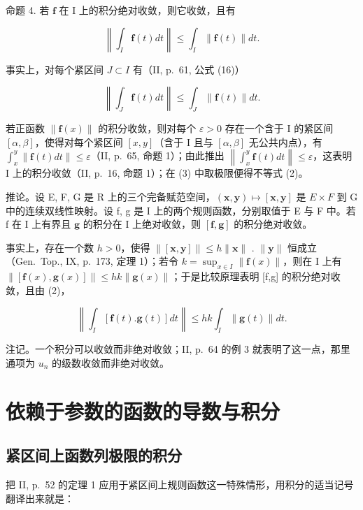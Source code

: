 命题 4. 若 \(\mathbf{f}\) 在 \(\mathrm{I}\) 上的积分绝对收敛，则它收敛，且有

\[
\left\| \int_ {I} \mathbf {f} (t) d t \right\| \leqslant \int_ {I} \| \mathbf {f} (t) \| d t.\tag{2}
\]

事实上，对每个紧区间 \(J \subset I\) 有（II, p.~61, 公式 (16)）

\[
\left\| \int_ {J} \mathbf {f} (t) d t \right\| \leqslant \int_ {J} \| \mathbf {f} (t) \| d t.\tag{3}
\]

若正函数 \(\|\mathbf{f}(x)\|\) 的积分收敛，则对每个 \(\varepsilon > 0\) 存在一个含于 I 的紧区间 \([\alpha, \beta]\)，使得对每个紧区间 \([x, y]\)（含于 I 且与 \([\alpha, \beta]\) 无公共内点），有 \(\int_{x}^{y} \|\mathbf{f}(t) dt\| \leqslant \varepsilon\)（II, p.~65, 命题 1）；由此推出 \(\left\|\int_{x}^{y} \mathbf{f}(t) dt\right\| \leqslant \varepsilon\)，这表明 I 上的积分收敛（II, p.~16, 命题 1）；在 (3) 中取极限便得不等式 (2)。

推论。设 E, F, G 是 R 上的三个完备赋范空间，\((\mathbf{x}, \mathbf{y}) \mapsto [\mathbf{x}, \mathbf{y}]\) 是 \(E \times F\) 到 G 中的连续双线性映射。设 f, g 是 I 上的两个规则函数，分别取值于 E 与 F 中。若 f 在 I 上有界且 \(\mathbf{g}\) 的积分在 I 上绝对收敛，则 \([\mathbf{f},\mathbf{g}]\) 的积分绝对收敛。

事实上，存在一个数 \(h > 0\)，使得 \(\| [\mathbf{x},\mathbf{y}] \| \leqslant h \| \mathbf{x} \|\) . \(\| \mathbf{y} \|\) 恒成立（Gen.~Top., IX, p.~173, 定理 1）；若令 \(k = \sup_{x \in I} \| \mathbf{f}(x) \|\)，则在 I 上有 \(\| [\mathbf{f}(x),\mathbf{g}(x)] \| \leqslant hk \| \mathbf{g}(x) \|\)；于是比较原理表明 {[}f,g{]} 的积分绝对收敛，且由 (2)，

\[
\left\| \int_ {I} [ \mathbf {f} (t). \mathbf {g} (t) ] d t \right\| \leqslant h k \int_ {I} \| \mathbf {g} (t) \| d t.
\]

注记。一个积分可以收敛而非绝对收敛；II, p.~64 的例 3 就表明了这一点，那里通项为 \(u_{n}\) 的级数收敛而非绝对收敛。

\section{依赖于参数的函数的导数与积分}

\subsection{紧区间上函数列极限的积分}

把 II, p.~52 的定理 1 应用于紧区间上规则函数这一特殊情形，用积分的适当记号翻译出来就是：

